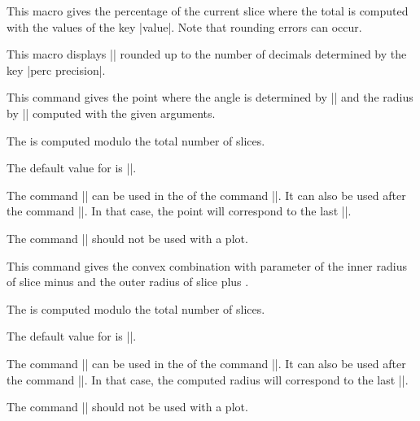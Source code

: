 \documentclass[a4paper,english,dvipsnames]{ltxdoc}
\begin{document}
\begin{command}{\WCpercentage}
This macro gives the percentage of the current slice where the total is computed with the values of the key |value|. Note that rounding errors can occur.
\begin{codeexample}[width=10cm,preamble={\usepackage{siunitx}}]
\begin{tikzpicture}
\wheelchart[
  data=\WCvarC\\\WCperc,
  slices style={
    \WCvarB!\fpeval{4*\WCpercentage}
  }
]{\exampleforthismanual}
\end{tikzpicture}
\end{codeexample}
\end{command}
\begin{command}{\WCpercentagerounded}
This macro displays |\WCpercentage| rounded up to the number of decimals determined by the key |perc precision|.
\end{command}
\begin{command}{\WCpoint{}}
This command gives the point where the angle is determined by |\WCangle| and the radius by |\WCradius| computed with the given arguments.

The  is computed modulo the total number of slices.

The default value for  is |\WCcount|.

The command |\WCpoint| can be used in the  of the command |\wheelchart|. It can also be used after the command |\wheelchart|. In that case, the point will correspond to the last |\wheelchart|.

The command |\WCpoint| should not be used with a plot.
\end{command}
\begin{command}{\WCradius{}}
This command gives the convex combination with parameter  of the inner radius of slice  minus  and the outer radius of slice  plus .

The  is computed modulo the total number of slices.

The default value for  is |\WCcount|.

The command |\WCradius| can be used in the  of the command |\wheelchart|. It can also be used after the command |\wheelchart|. In that case, the computed radius will correspond to the last |\wheelchart|.

The command |\WCradius| should not be used with a plot.
\end{command}
\end{document}
